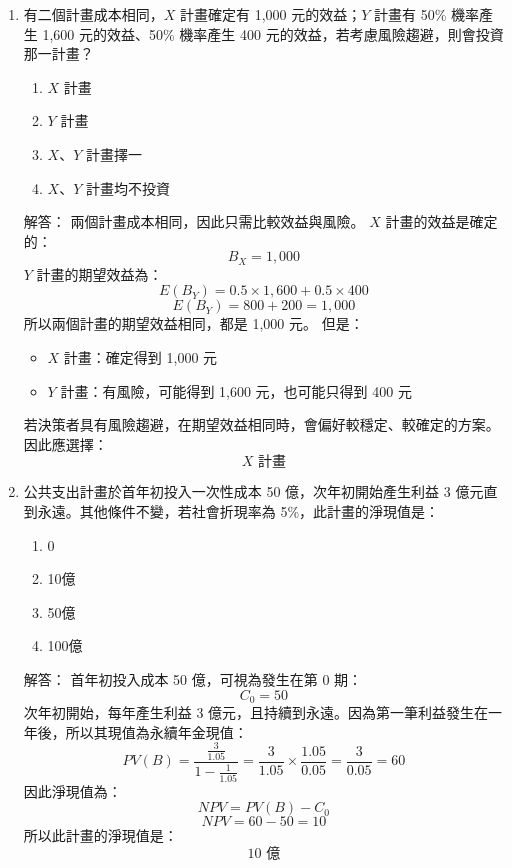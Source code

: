 \documentclass[12pt, a4paper]{article}
\begin{document}
\begin{enumerate}
    \item 有二個計畫成本相同，\(X\) 計畫確定有 1,000 元的效益；\(Y\) 計畫有 50\% 機率產生 1,600 元的效益、50\% 機率產生 400 元的效益，若考慮風險趨避，則會投資那一計畫？
    \begin{enumerate}[label=\Alph*.]
        \item \(X\) 計畫
        \item \(Y\) 計畫
        \item \(X\)、\(Y\) 計畫擇一
        \item \(X\)、\(Y\) 計畫均不投資
    \end{enumerate}
    解答：
    兩個計畫成本相同，因此只需比較效益與風險。
    \(X\) 計畫的效益是確定的：
    \[
    B_X = 1,000
    \]
    \(Y\) 計畫的期望效益為：
    \[
    E(B_Y) = 0.5 \times 1,600 + 0.5 \times 400
    \]
    \[
    E(B_Y) = 800 + 200 = 1,000
    \]
    所以兩個計畫的期望效益相同，都是 1,000 元。
    但是：
    \begin{itemize}
        \item \(X\) 計畫：確定得到 1,000 元
        \item \(Y\) 計畫：有風險，可能得到 1,600 元，也可能只得到 400 元
    \end{itemize}
    若決策者具有風險趨避，在期望效益相同時，會偏好較穩定、較確定的方案。
    因此應選擇：
    \[
    \boxed{X\text{ 計畫}}
    \]

    \item 公共支出計畫於首年初投入一次性成本 50 億，次年初開始產生利益 3 億元直到永遠。其他條件不變，若社會折現率為 5\%，此計畫的淨現值是：
    \begin{enumerate}[label=\Alph*.]
        \item 0
        \item 10億
        \item 50億
        \item 100億
    \end{enumerate}
    解答：
    首年初投入成本 50 億，可視為發生在第 0 期：
    \[
    C_0 = 50
    \]
    次年初開始，每年產生利益 3 億元，且持續到永遠。因為第一筆利益發生在一年後，所以其現值為永續年金現值：
    \[
    PV(B) = \frac{\frac{3}{1.05}}{1-\frac{1}{1.05}} = \frac{3}{1.05} \times\frac{1.05}{0.05} = \frac{3}{0.05} = 60
    \]
    因此淨現值為：
    \[
    NPV = PV(B) - C_0
    \]
    \[
    NPV = 60 - 50 = 10
    \]
    所以此計畫的淨現值是：
    \[
    \boxed{10\text{ 億}}
    \]


\end{enumerate}
\end{document}
